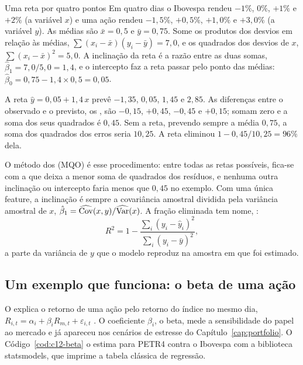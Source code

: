 \begin{exemplo}{Uma reta por quatro pontos}
Em quatro dias o Ibovespa rendeu $-1\%$, $0\%$, $+1\%$ e $+2\%$ (a variável $x$) e uma ação rendeu $-1,5\%$, $+0,5\%$, $+1,0\%$ e $+3,0\%$ (a variável $y$). As médias são $\bar x = 0,5$ e $\bar y = 0,75$. Some os produtos dos desvios em relação às médias, $\sum (x_i - \bar x)(y_i - \bar y) = 7,0$, e os quadrados dos desvios de $x$, $\sum (x_i - \bar x)^2 = 5,0$. A inclinação da reta é a razão entre as duas somas, $\hat\beta_1 = 7,0/5,0 = 1,4$, e o intercepto faz a reta passar pelo ponto das médias: $\hat\beta_0 = 0,75 - 1,4 \times 0,5 = 0,05$.

A reta $\hat y = 0,05 + 1,4\,x$ prevê $-1,35$, $0,05$, $1,45$ e $2,85$. As diferenças entre o observado e o previsto, os , são $-0,15$, $+0,45$, $-0,45$ e $+0,15$; somam zero e a soma dos seus quadrados é $0,45$. Sem a reta, prevendo sempre a média $0,75$, a soma dos quadrados dos erros seria $10,25$. A reta eliminou $1 - 0,45/10,25 = 96\%$ dela.
\end{exemplo}

O método dos  (MQO) é esse procedimento: entre todas as retas possíveis, fica-se com a que deixa a menor soma de quadrados dos resíduos, e nenhuma outra inclinação ou intercepto faria menos que $0,45$ no exemplo. Com uma única feature, a inclinação é sempre a covariância amostral dividida pela variância amostral de $x$, $\hat\beta_1 = \widehat{\operatorname{Cov}}(x, y) / \widehat{\operatorname{Var}}(x)$. A fração eliminada tem nome, :
\begin{equation}
  R^2 = 1 - \frac{\sum_i (y_i - \hat y_i)^2}{\sum_i (y_i - \bar y)^2} ,
  \label{eq:c12-r2}
\end{equation}
a parte da variância de $y$ que o modelo reproduz na amostra em que foi estimado.

\subsection{Um exemplo que funciona: o beta de uma ação}

O  explica o retorno de uma ação pelo retorno do índice no mesmo dia, $R_{i,t} = \alpha_i + \beta_i R_{m,t} + \varepsilon_{i,t}$ \citep[capítulo 4]{campbell1997}. O coeficiente $\beta_i$, o beta, mede a sensibilidade do papel ao mercado e já apareceu nos cenários de estresse do Capítulo~\ref{cap:portfolio}. O Código~\ref{cod:c12-beta} o estima para PETR4 contra o Ibovespa com a biblioteca statsmodels, que imprime a tabela clássica de regressão.

